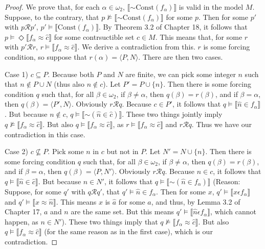 \documentclass{article}
\newcommand*{\oldneg}{\mathord{\sim}}
\newcommand{\lbc}{\llbracket}
\newcommand{\rbc}{\rrbracket}
\theoremstyle{definition}
\begin{document}
\begin{proof}

We prove that, for each $\alpha\in\omega_2$, $\lbc\oldneg\textrm{Const}(f_\alpha)\rbc$ is valid in the model
$M$. Suppose, to the contrary, that $p\nvDash\lbc\oldneg\textrm{Const}(f_\alpha)\rbc$ for some $p$. 
Then for some $p'$ with $p\mathcal{R}p'$, $p'\vDash\lbc\textrm{Const}(f_\alpha)\rbc$. By Theorem 3.2 of 
Chapter 18, it follows that $p\vDash\Diamond\lbc f_\alpha\approx\hat{c}\rbc$ for some contrsuctible set $c\in M$.
This means that, for some $r$ with $p'\mathcal{R}r$, $r\vDash\lbc f_\alpha\approx\hat{c}\rbc$. We derive a 
contradiction from this. $r$ is some forcing condition, so 
suppose that $r(\alpha)=\langle P,N\rangle$. There are then two cases.

Case 1) $c\subseteq P$. Because both $P$ and $N$ are finite, we can pick some integer $n$ 
such that $n\notin P\cup N$ (thus also $n\notin c$). Let $P'=P\cup\{n\}$. Then there is some 
forcing condition $q$ such that, for all $\beta\in\omega_2$, if $\beta\ne\alpha$, then 
$q(\beta)=r(\beta)$, and if $\beta=\alpha$, then $q(\beta)=\langle P',N\rangle$. Obviously 
$r\mathcal{R}q$. Because $c\in P'$, it follows that 
$q\vDash\lbc\hat{n}\in f_\alpha\rbc$. But because $n\notin c$, $q\vDash\lbc\oldneg(\hat{n}\in\hat{c})\rbc$. 
These two things jointly imply $q\nvDash\lbc f_\alpha\approx\hat{c}\rbc$. But 
also $q\vDash\lbc f_\alpha\approx\hat{c}\rbc$, as $r\vDash\lbc f_\alpha\approx\hat{c}\rbc$ and 
$r\mathcal{R}q$. Thus we have our contradiction in this case.

Case 2) $c\nsubseteq P$. Pick some $n$ in $c$ but not in $P$. Let $N'=N\cup\{n\}$. 
Then there is some forcing condition $q$ such that, for all $\beta\in\omega_2$, if 
$\beta\ne\alpha$, then $q(\beta)=r(\beta)$, and if $\beta=\alpha$, then $q(\beta)=\langle P,N'\rangle$. Obviously 
$r\mathcal{R}q$. Because $n\in c$, it follows that 
$q\vDash\lbc\hat{n}\in\hat{c}\rbc$. But because $n\in N'$, it follows that $q\vDash\lbc\oldneg(\hat{n}\in f_\alpha)\rbc$ (Reason: 
Suppose, for some $q'$ with $q\mathcal{R}q'$, that $q'\vDash\hat{n}\in f_\alpha$. Then for some 
$x$, $q'\vDash\lbc x\epsilon f_\alpha\rbc$ and $q'\vDash\lbc x\approx\hat{n}\rbc$. This means 
$x$ is $\hat{a}$ for some $a$, and thus, by Lemma 3.2 of Chapter 17, $a$ and $n$ are the same set. But 
this means $q'\vDash\lbc\hat{n}\epsilon f_\alpha\rbc$, which cannot happen, as $n\in N'$). These 
two things imply that $q\nvDash\lbc f_\alpha\approx\hat{c}\rbc$. But also $q\vDash\lbc f_\alpha\approx\hat{c}\rbc$ (for the 
same reason as in the first case), which is our contradiction.

\end{proof}
\end{document}
